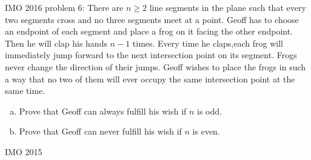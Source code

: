 IMO 2016 problem 6:  There are $n\ge 2$ line segments in the plane such that every two segments cross and no three segments meet at a point. Geoff has to choose an endpoint of each segment and place a frog on it facing the other endpoint. Then he will clap his hands $n-1$ times. Every time he claps,each frog will immediately jump forward to the next intersection point on its segment. Frogs never change the direction of their jumps. Geoff wishes to place the frogs in such a way that no two of them will ever occupy the same intersection point at the same time.
\begin{enumerate}[(a)]
  \item Prove that Geoff can always fulfill his wish if $n$ is odd.
  \item Prove that Geoff can never fulfill his wish if $n$ is even.
\end{enumerate} 

IMO 2015 

